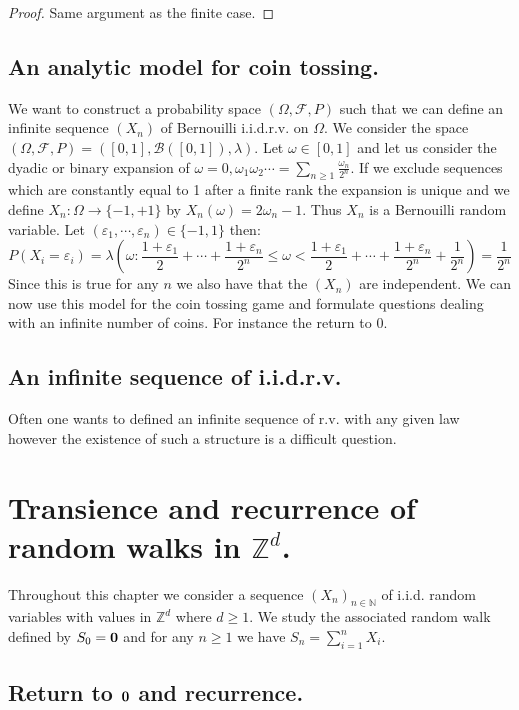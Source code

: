 \documentclass[10pt,a4paper]{book}
\theoremstyle{definition}
\begin{document}
\begin{proof}
Same argument as the finite case. 
\end{proof}

\section{An analytic model for coin tossing.}
We want to construct a probability space $(\Omega, \mathcal{F}, P)$ such that we can define an infinite sequence $(X_n)$ of Bernouilli i.i.d.r.v. on $\Omega$. We consider the space $(\Omega, \mathcal{F}, P) = ([0, 1], \mathcal{B}([0,1]), \lambda)$. Let $\omega \in [0, 1]$ and let us consider the dyadic or binary expansion of $\omega = 0, \omega_1 \omega_2 \cdots = \sum_{n \geq 1} \frac{\omega_n}{2^n}$. If we exclude sequences which are constantly equal to 1 after a finite rank the expansion is unique and we define $X_n : \Omega \to \{-1, +1\}$ by $X_n(\omega) = 2\omega_n - 1$. Thus $X_n$ is a Bernouilli random variable. Let $(\varepsilon_1, \cdots, \varepsilon_n) \in \{-1, 1\}$ then:
\[
P(X_i = \varepsilon_i) =  \lambda(\omega : \frac{1 + \varepsilon_1}{2} + \cdots + \frac{1 + \varepsilon_n}{2^n} \leq \omega < \frac{1 + \varepsilon_1}{2} + \cdots + \frac{1 + \varepsilon_n}{2^n} + \frac{1}{2^n}) = \frac{1}{2^n}
\]  
Since this is true for any $n$ we also have that the $(X_n)$ are independent. We can now use this model for the coin tossing game and formulate questions dealing with an infinite number of coins. For instance the return to 0. 

\section{An infinite sequence of i.i.d.r.v.}
Often one wants to defined an infinite sequence of r.v. with any given law however the existence of such a structure is a difficult question. 


\chapter{Transience and recurrence of random walks in $\mathbb{Z}^d$.}
Throughout this chapter we consider a sequence $(X_n)_{n \in \mathbb{N}}$ of i.i.d. random variables with values in $\mathbb{Z}^d$ where $d \geq 1$. We study the associated random walk defined by $S_0 = \vb{0}$ and for any $n\geq 1$ we have $S_n = \sum_{i = 1}^n X_i$. 

\section{Return to $\vb{0}$ and recurrence.}
\end{document}
